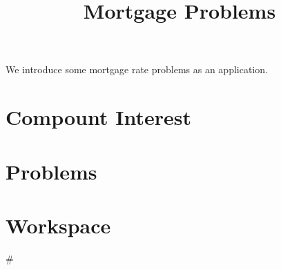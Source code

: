 \documentclass{ximera}
\title{Mortgage Problems}
\begin{document}
We introduce some mortgage rate problems as an application.
\begin{abstract}  
\end{abstract}  
\maketitle

\section{Compount Interest}

\section{Problems}

\begin{question}
\end{question}

\begin{question}
\end{question}

\section{Workspace}

\begin{sageCell}
#
\end{sageCell}
\end{document}
